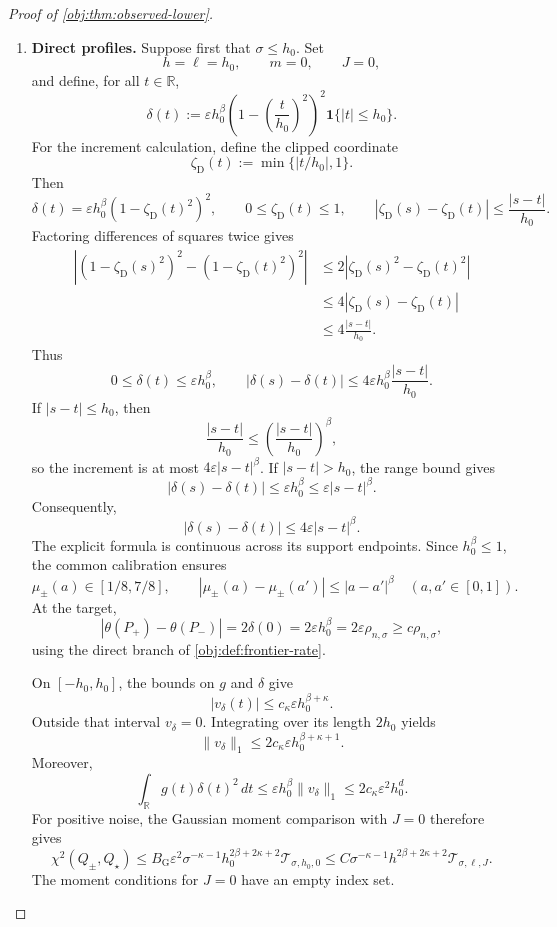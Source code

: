 \begin{proof}[Proof of \cref{obj:thm:observed-lower}]
\begin{enumerate}
\item \textbf{Direct profiles.}
Suppose first that \(\sigma\le h_0\). Set
\[
h=\ell=h_0,\qquad m=0,\qquad J=0,
\]
and define, for all \(t\in\mathbb R\),
\[
\delta(t):=
\varepsilon h_0^\beta
\left(1-\left(\frac{t}{h_0}\right)^2\right)^2
\mathbf1\{|t|\le h_0\}.
\]
For the increment calculation, define the clipped coordinate
\[
\zeta_{\mathrm D}(t):=\min\{|t/h_0|,1\}.
\]
Then
\[
\delta(t)=\varepsilon h_0^\beta
(1-\zeta_{\mathrm D}(t)^2)^2,
\qquad
0\le\zeta_{\mathrm D}(t)\le1,
\qquad
|\zeta_{\mathrm D}(s)-\zeta_{\mathrm D}(t)|
\le\frac{|s-t|}{h_0}.
\]
Factoring differences of squares twice gives
\[
\begin{aligned}
\left|(1-\zeta_{\mathrm D}(s)^2)^2
-(1-\zeta_{\mathrm D}(t)^2)^2\right|
&\le2|\zeta_{\mathrm D}(s)^2-\zeta_{\mathrm D}(t)^2|\\
&\le4|\zeta_{\mathrm D}(s)-\zeta_{\mathrm D}(t)|\\
&\le4\frac{|s-t|}{h_0}.
\end{aligned}
\]
Thus
\[
0\le\delta(t)\le\varepsilon h_0^\beta,\qquad
|\delta(s)-\delta(t)|
\le4\varepsilon h_0^\beta\frac{|s-t|}{h_0}.
\]
If \(|s-t|\le h_0\), then
\[
\frac{|s-t|}{h_0}
\le\left(\frac{|s-t|}{h_0}\right)^\beta,
\]
so the increment is at most \(4\varepsilon|s-t|^\beta\). If \(|s-t|>h_0\), the range bound gives
\[
|\delta(s)-\delta(t)|
\le\varepsilon h_0^\beta
\le\varepsilon|s-t|^\beta.
\]
Consequently,
\[
|\delta(s)-\delta(t)|\le4\varepsilon|s-t|^\beta.
\]
The explicit formula is continuous across its support endpoints. Since \(h_0^\beta\le1\), the common calibration ensures
\[
\mu_\pm(a)\in[1/8,7/8],\qquad
|\mu_\pm(a)-\mu_\pm(a')|\le|a-a'|^\beta
\quad(a,a'\in[0,1]).
\]
At the target,
\[
|\theta(P_+)-\theta(P_-)|
=2\delta(0)=2\varepsilon h_0^\beta
=2\varepsilon\rho_{n,\sigma}
\ge c\rho_{n,\sigma},
\]
using the direct branch of \cref{obj:def:frontier-rate}.

On \([-h_0,h_0]\), the bounds on \(g\) and \(\delta\) give
\[
|v_\delta(t)|\le c_\kappa\varepsilon h_0^{\beta+\kappa}.
\]
Outside that interval \(v_\delta=0\). Integrating over its length \(2h_0\) yields
\[
\|v_\delta\|_1
\le2c_\kappa\varepsilon h_0^{\beta+\kappa+1}.
\]
Moreover,
\[
\int_{\mathbb R}g(t)\delta(t)^2\,dt
\le\varepsilon h_0^\beta\|v_\delta\|_1
\le2c_\kappa\varepsilon^2h_0^d.
\]
For positive noise, the Gaussian moment comparison with \(J=0\) therefore gives
\[
\chi^2(Q_\pm,Q_\star)
\le
B_{\mathrm G}\varepsilon^2
\sigma^{-\kappa-1}h_0^{2\beta+2\kappa+2}
\mathcal T_{\sigma,h_0,0}
\le
C\sigma^{-\kappa-1}h^{2\beta+2\kappa+2}
\mathcal T_{\sigma,\ell,J}.
\]
The moment conditions for \(J=0\) have an empty index set.


\end{enumerate}
\end{proof}

